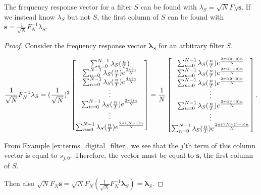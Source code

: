 \begin{theorem}
    The frequency response vector for a filter $S$ can be found with $\lambda_S = \sqrt{N} F_N\mathbf{s}$. If we instead know $\lambda_S$ but not $S$, the first column of $S$ can be found with $\mathbf{s} = \frac{1}{\sqrt{N}} F^{-1}_N\lambda_S$.\cite{Ryan}

    \begin{proof}
        Consider the frequency response vector $\mathbf{\lambda}_S$ for an arbitrary filter $S$.
        
        $$\frac{1}{\sqrt{N}} F^{-1}_N\mathbf{\lambda}_S = (\frac{1}{\sqrt{N}})^2 \begin{bmatrix}
            \sum_{n=0}^{N-1} \lambda_S(\frac{n}{T})\\
            \sum_{n=0}^{N-1} \lambda_S(\frac{n}{T}) e^{\frac{2 \pi i n}{N}}\\
            \sum_{n=0}^{N-1} \lambda_S(\frac{n}{T}) e^{\frac{4\pi in}{N}}\\
            \vdots \\
            \sum_{n=0}^{N-1} \lambda_S(\frac{n}{T}) e^{\frac{2 \pi i jn}{N}}\\
            \vdots \\
            \sum_{n=0}^{N-1} \lambda_S(\frac{n}{T}) e^{\frac{2 \pi i (N-1)n}{N}}\\
        \end{bmatrix} = \frac{1}{N} \begin{bmatrix}
            \sum_{n=0}^{N-1} \lambda_S(\frac{n}{T}) e^{\frac{2 \pi i (0-0)n}{N}}\\
            \sum_{n=0}^{N-1} \lambda_S(\frac{n}{T}) e^{\frac{2 \pi i (1-0)n}{N}}\\
            \sum_{n=0}^{N-1} \lambda_S(\frac{n}{T}) e^{\frac{2 \pi i (2-0)n}{N}}\\
            \vdots \\
            \sum_{n=0}^{N-1} \lambda_S(\frac{n}{T}) e^{\frac{2 \pi i (j-0)n}{N}}\\
            \vdots \\
            \sum_{n=0}^{N-1} \lambda_S(\frac{n}{T}) e^{\frac{2 \pi i ((N-1)-0)n}{N}}\\
        \end{bmatrix}.$$
        
        From Example \ref{ex:terms_digital_filter}, we see that the $j$'th term of this column vector is equal to $s_{j,0}$. Therefore, the vector must be equal to $\mathbf{s}$, the first column of $S$.
        
        \bigskip Then also $\sqrt{N} F_N\mathbf{s} = \sqrt{N} F_N(\frac{1}{\sqrt{N}} F^{-1}_N\mathbf{\lambda}_S) = \mathbf{\lambda}_S$.
    \end{proof}
\end{theorem}

